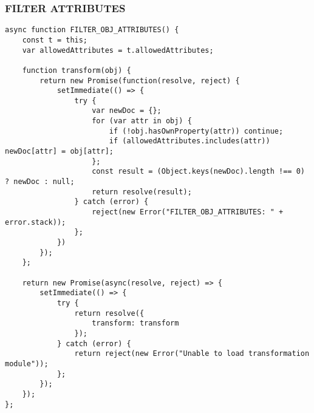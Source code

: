 \subsubsection{FILTER ATTRIBUTES}
\label{netl-trans-filter-attributes}
\begin{verbatim}
async function FILTER_OBJ_ATTRIBUTES() {
    const t = this;
    var allowedAttributes = t.allowedAttributes;

    function transform(obj) {
        return new Promise(function(resolve, reject) {
            setImmediate(() => {
                try {
                    var newDoc = {};
                    for (var attr in obj) {
                        if (!obj.hasOwnProperty(attr)) continue;
                        if (allowedAttributes.includes(attr)) newDoc[attr] = obj[attr];
                    };
                    const result = (Object.keys(newDoc).length !== 0) ? newDoc : null;
                    return resolve(result);
                } catch (error) {
                    reject(new Error("FILTER_OBJ_ATTRIBUTES: " + error.stack));
                };
            })
        });
    };

    return new Promise(async(resolve, reject) => {
        setImmediate(() => {
            try {
                return resolve({
                    transform: transform
                });
            } catch (error) {
                return reject(new Error("Unable to load transformation module"));
            };
        });
    });
};
\end{verbatim}


